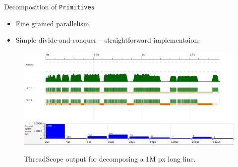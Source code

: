 \documentclass[slidestop,compress,mathserif, xcolor=table]{beamer}
\begin{document}
\begin{frame}[c]{Decomposition of \texttt{Primitives}}
  \begin{itemize}
  \item Fine grained parallelism.
  \item Simple divide-and-conquer -- straightforward implementaion.
  \end{itemize}
  \begin{figure}[h!]
    \centering
    \includegraphics[width=0.7\linewidth]{../threadscope/lines/single-line-every-10}\\
    \includegraphics[width=0.7\linewidth]{../threadscope/lines/single-line-every-10-spark-times}
    \caption{ThreadScope output for decomposing a 1M px long line.}
  \label{fig:line-thread-sparks}

\end{figure}
\end{frame}
\end{document}
